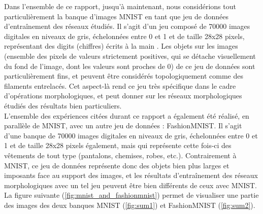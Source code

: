 Dans l'ensemble de ce rapport, jusqu'à maintenant, nous considérions tout particulièrement la banque d'images MNIST en tant que jeu de données d'entraînement des réseaux étudiés. Il s'agit d'un jeu composé de 70000 images digitales en niveaux de gris, échelonnées entre 0 et 1 et de taille 28x28 pixels, représentant des digits (chiffres) écrits à la main \cite{LeCun_2005}. Les objets sur les images (ensemble des pixels de valeurs strictement positives, qui se détache visuellement du fond de l'image, dont les valeurs sont proches de 0) de ce jeu de données sont particulièrement fins, et peuvent être considérés topologiquement comme des filaments entrelacés. Cet aspect-là rend ce jeu très spécifique dans le cadre d'opérations morphologiques, et peut donner sur les réseaux morphologiques étudiés des résultats bien particuliers. \\

\vspace{-1.2mm}
\noindent L'ensemble des expériences citées durant ce rapport a également été réalisé, en parallèle de MNIST, avec un autre jeu de données : FashionMNIST. Il s'agit d'une banque de 70000 images digitales en niveaux de gris, échelonnées entre 0 et 1 et de taille 28x28 pixels également, mais qui représente cette fois-ci des vêtements de tout type (pantalons, chemises, robes, etc.). Contrairement à MNIST, ce jeu de données représente donc des objets bien plus larges et imposants face au support des images, et les résultats d'entraînement des réseaux morphologiques avec un tel jeu peuvent être bien différents de ceux avec MNIST. \\

\vspace{-1.2mm}
\noindent La figure suivante (\ref{fig:mnist_and_fashionmnist}) permet de visualiser une partie des images des deux banques MNIST (\ref{fig:sum1}) et FashionMNIST (\ref{fig:sum2}). \\

